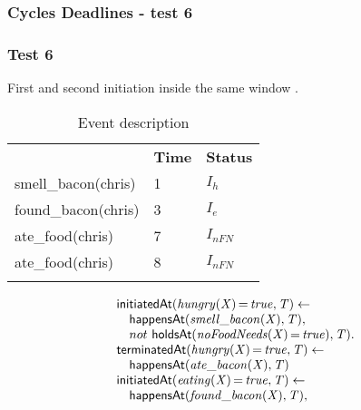 \documentclass[8pt]{beamer}
\DeclareMathOperator{\val}{=}  %
\def \patsize {}
\def\happensAt{\textsf{\patsize happensAt}}
\def\holdsAt{\textsf{\patsize holdsAt}}
\def\initiatedAt{\textsf{\patsize initiatedAt}}
\def\terminatedAt{\textsf{\patsize terminatedAt}}
\newenvironment{mysplit}%
  {\arraycolsep 0pt \begin{array}{l}}%
  {\end{array}}
\begin{document}
\begin{frame}
    \frametitle{Cycles Deadlines - test 6}
    \subsubsection{Test 6}
    \small
    First and second initiation inside the same window .\linebreak
    \begin{minipage}{0.4\linewidth}
        \begin{table}[t!]
            \caption{Event description}
            \begin{center}

                \begin{tabular}{lll}
                    \hline\noalign{\smallskip}
                    \multicolumn{1}{l}{\textbf{Event}} & \multicolumn{1}{c}{\textbf{Time}} & \multicolumn{1}{c}{\textbf{Status}} \\
                    smell\_bacon(chris)& 1 & $I_{h}$\\
                    found\_bacon(chris)& 3 & $I_{e}$\\
                    ate\_food(chris)& 7  & $I_{nFN}$\\
                    ate\_food(chris)& 8  & $I_{nFN}$\\
                    \noalign{\smallskip}
                    \hline
                \end{tabular}
            \end{center}
        \end{table}
    \end{minipage}
    \begin{minipage}{0.55\linewidth}
        \begin{align*}
            \begin{mysplit}
                \initiatedAt\mathit{(hungry(X)\val true,T)\leftarrow}\\
                \quad    \happensAt\mathit{(smell\_bacon(X),T),}\\
                \quad    not\ \holdsAt\mathit{(noFoodNeeds(X)\val true),T).}\\
                \terminatedAt\mathit{(hungry(X)\val true,T)\leftarrow}\\
                \quad    \happensAt\mathit{(ate\_bacon(X),T)}\\
                \initiatedAt\mathit{(eating(X)\val true,T)\leftarrow}\\
                \quad    \happensAt\mathit{(found\_bacon(X),T),}\\

\end{mysplit}
\end{align*}
\end{minipage}
\end{frame}
\end{document}
